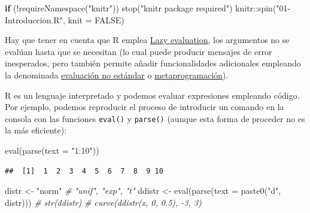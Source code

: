 \documentclass[
]{book}
\newenvironment{Shaded}{\begin{snugshade}}{\end{snugshade}}
\newcommand{\AttributeTok}[1]{\textcolor[rgb]{0.77,0.63,0.00}{#1}}
\newcommand{\CommentTok}[1]{\textcolor[rgb]{0.56,0.35,0.01}{\textit{#1}}}
\newcommand{\ConstantTok}[1]{\textcolor[rgb]{0.00,0.00,0.00}{#1}}
\newcommand{\ControlFlowTok}[1]{\textcolor[rgb]{0.13,0.29,0.53}{\textbf{#1}}}
\newcommand{\FunctionTok}[1]{\textcolor[rgb]{0.00,0.00,0.00}{#1}}
\newcommand{\NormalTok}[1]{#1}
\newcommand{\OtherTok}[1]{\textcolor[rgb]{0.56,0.35,0.01}{#1}}
\newcommand{\SpecialCharTok}[1]{\textcolor[rgb]{0.00,0.00,0.00}{#1}}
\newcommand{\StringTok}[1]{\textcolor[rgb]{0.31,0.60,0.02}{#1}}
\theoremstyle{break}
\theoremstyle{nonumberplain}
\begin{document}
\begin{Shaded}
\begin{Highlighting}[]
\ControlFlowTok{if}\NormalTok{ (}\SpecialCharTok{!}\FunctionTok{requireNamespace}\NormalTok{(}\StringTok{"knitr"}\NormalTok{)) }\FunctionTok{stop}\NormalTok{(}\StringTok{"\textquotesingle{}knitr\textquotesingle{} package required"}\NormalTok{)}
\NormalTok{knitr}\SpecialCharTok{::}\FunctionTok{spin}\NormalTok{(}\StringTok{"01{-}Introduccion.R"}\NormalTok{, }\AttributeTok{knit =} \ConstantTok{FALSE}\NormalTok{)}
\end{Highlighting}
\end{Shaded}

Hay que tener en cuenta que R emplea \href{https://adv-r.hadley.nz/functions.html\#lazy-evaluation}{Lazy evaluation}, los argumentos no se evalúan hasta que se necesitan (lo cual puede producir mensajes de error inesperados, pero también permite añadir funcionalidades adicionales empleando la denominada \href{http://adv-r.had.co.nz/Computing-on-the-language.html}{evaluación no estándar} o \href{https://adv-r.hadley.nz/metaprogramming.html}{metaprogramación}).

R es un lenguaje interpretado y podemos evaluar expresiones empleando código.
Por ejemplo, podemos reproducir el proceso de introducir un comando en la consola con las funciones \texttt{eval()} y \texttt{parse()} (aunque esta forma de proceder no es la más eficiente):

\begin{Shaded}
\begin{Highlighting}[]
\FunctionTok{eval}\NormalTok{(}\FunctionTok{parse}\NormalTok{(}\AttributeTok{text =} \StringTok{"1:10"}\NormalTok{))}
\end{Highlighting}
\end{Shaded}

\begin{verbatim}
##  [1]  1  2  3  4  5  6  7  8  9 10
\end{verbatim}

\begin{Shaded}
\begin{Highlighting}[]
\NormalTok{distr }\OtherTok{\textless{}{-}} \StringTok{"norm"}  \CommentTok{\# "unif", "exp", "t"}
\NormalTok{ddistr }\OtherTok{\textless{}{-}} \FunctionTok{eval}\NormalTok{(}\FunctionTok{parse}\NormalTok{(}\AttributeTok{text =} \FunctionTok{paste0}\NormalTok{(}\StringTok{"d"}\NormalTok{, distr)))}
\CommentTok{\# str(ddistr)}
\CommentTok{\# curve(ddistr(x, 0, 0.5), {-}3, 3)}
\end{Highlighting}
\end{Shaded}
\end{document}
